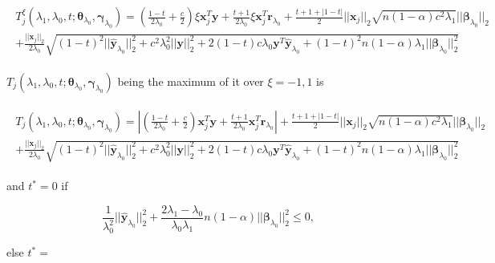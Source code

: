 \begin{gather}
    \begin{aligned}
        T^\xi_j(\lambda_1,\lambda_0,t;\boldsymbol\theta_{\lambda_0},\boldsymbol\gamma_{\lambda_0})=  \left(\frac{1-t}{2\lambda_0}+\frac{c}{2}\right)\xi\boldsymbol x_j^T \boldsymbol y+\frac{t+1}{2\lambda_0}\xi \boldsymbol x_j^T \boldsymbol r_{\lambda_0}+\frac{t+1+|1-t|}{2}||\boldsymbol x_j||_2\sqrt{n(1-\alpha) c^2\lambda_1}||\boldsymbol\beta_{\lambda_0}||_2\\
        +\frac{||\boldsymbol x_j||_2}{2\lambda_0}\sqrt{(1-t)^2||\hat{\boldsymbol y}_{\lambda_0}||_2^2+c^2\lambda_0^2||\boldsymbol y||_2^2+2(1-t)c\lambda_0 \boldsymbol y^T\hat{\boldsymbol y}_{\lambda_0}+(1-t)^2n(1-\alpha)\lambda_1||\boldsymbol\beta_{\lambda_0}||_2^2}
    \end{aligned}
\end{gather}

$T_j(\lambda_1,\lambda_0,t;\boldsymbol\theta_{\lambda_0},\boldsymbol\gamma_{\lambda_0})$ being the maximum of it over $\xi=-1,1$ is

\begin{gather}
    \begin{aligned}
        T_j(\lambda_1,\lambda_0,t;\boldsymbol\theta_{\lambda_0},\boldsymbol\gamma_{\lambda_0})= \left| \left(\frac{1-t}{2\lambda_0}+\frac{c}{2}\right)\boldsymbol x_j^T \boldsymbol y+\frac{t+1}{2\lambda_0} \boldsymbol x_j^T \boldsymbol r_{\lambda_0}\right|+\frac{t+1+|1-t|}{2}||\boldsymbol x_j||_2\sqrt{n(1-\alpha) c^2\lambda_1}||\boldsymbol\beta_{\lambda_0}||_2\\
        +\frac{||\boldsymbol x_j||_2}{2\lambda_0}\sqrt{(1-t)^2||\hat{\boldsymbol y}_{\lambda_0}||_2^2+c^2\lambda_0^2||\boldsymbol y||_2^2+2(1-t)c\lambda_0 \boldsymbol y^T\hat{\boldsymbol y}_{\lambda_0}+(1-t)^2n(1-\alpha)\lambda_1||\boldsymbol\beta_{\lambda_0}||_2^2}
    \end{aligned}
\end{gather}

and $t^*=0$ if

\begin{equation}
    \frac{1}{\lambda_0^2}||\hat{\boldsymbol y}_{\lambda_0}||_2^2+\frac{2\lambda_1-\lambda_0}{\lambda_0\lambda_1}n(1-\alpha)||\boldsymbol\beta_{\lambda_0}||_2^2\leq 0,
\end{equation}

else $t^*=$

